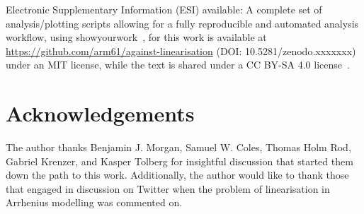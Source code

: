 \documentclass[reprint,superscriptaddress,nobibnotes,amsmath,amssymb]{revtex4-2}
\begin{document}
Electronic Supplementary Information (ESI) available: A complete set of analysis/plotting scripts allowing for a fully reproducible and automated analysis workflow, using showyourwork~\cite{luger_showyourwork_2021}, for this work is available at \url{https://github.com/arm61/against-linearisation} (DOI: 10.5281/zenodo.xxxxxxx) under an MIT license, while the text is shared under a CC BY-SA 4.0 license~\cite{mccluskey_github_2023}. \\

\section*{Acknowledgements}

The author thanks Benjamin J. Morgan, Samuel W. Coles, Thomas Holm Rod, Gabriel Krenzer, and Kasper Tolberg for insightful discussion that started them down the path to this work. 
Additionally, the author would like to thank those that engaged in discussion on Twitter when the problem of linearisation in Arrhenius modelling was commented on. 


\end{document}
